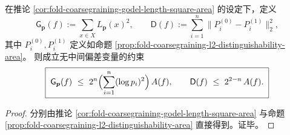 \begin{corollary}\label{cor:fold-godel-stokes-triangle-constraint}
在推论 \ref{cor:fold-coarsegraining-godel-length-square-area} 的设定下，定义
\[
\mathsf{G}_{\boldsymbol p}(f):=\sum_{x\in X}L_{\boldsymbol p}(x)^2,
\qquad
\mathsf{D}(f):=\sum_{i=1}^n\bigl\|P_i^{(0)}-P_i^{(1)}\bigr\|_2^2,
\]
其中 \(P_i^{(0)},P_i^{(1)}\) 定义如命题 \ref{prop:fold-coarsegraining-l2-distinguishability-area}。
则成立无中间偏差变量的约束
\[
\boxed{\;
\mathsf{G}_{\boldsymbol p}(f)\ \le\ 2^n\Bigl(\sum_{i=1}^n(\log p_i)^2\Bigr)\,A(f),
\qquad
\mathsf{D}(f)\ \le\ 2^{2-n}\,A(f).\;}
\]
\end{corollary}
\begin{proof}
分别由推论 \ref{cor:fold-coarsegraining-godel-length-square-area} 与命题 \ref{prop:fold-coarsegraining-l2-distinguishability-area} 直接得到。证毕。
\end{proof}

\endinput
